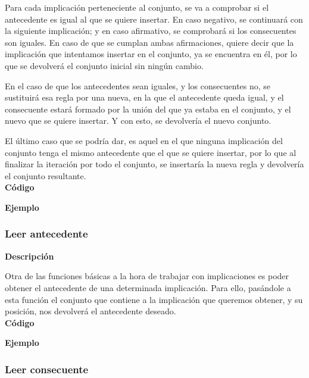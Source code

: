     Para cada implicaci\'on perteneciente al conjunto, se va a comprobar si el antecedente es igual al que se quiere insertar.
    En caso negativo, se continuar\'a con la siguiente implicaci\'on; y en caso afirmativo, se comprobar\'a si los consecuentes son 
    iguales. En caso de que se cumplan ambas afirmaciones, quiere decir que la implicaci\'on que intentamos insertar en el conjunto, 
    ya se encuentra en \'el, por lo que se devolver\'a el conjunto inicial sin ning\'un cambio.

    En el caso de que los antecedentes sean iguales, y los consecuentes no, se sustituir\'a esa regla por una nueva, en la que el antecedente 
    queda igual, y el consecuente estar\'a formado por la uni\'on del que ya estaba en el conjunto, y el nuevo que se quiere insertar. Y con 
    esto, se devolver\'ia el nuevo conjunto.

    El \'ultimo caso que se podr\'ia dar, es aquel en el que ninguna implicaci\'on del conjunto tenga el mismo antecedente que el que se 
    quiere insertar, por lo que al finalizar la iteraci\'on por todo el conjunto, se insertar\'ia la nueva regla y devolver\'ia el conjunto 
    resultante.
    \\


    \textbf{C\'odigo}

    


    \textbf{Ejemplo}


\subsubsection{Leer antecedente}

    \textbf{Descripci\'on}

    Otra de las funciones b\'asicas a la hora de trabajar con implicaciones es poder obtener el antecedente de una determinada 
    implicaci\'on. Para ello, pas\'andole a esta funci\'on el conjunto que contiene a la implicaci\'on que queremos obtener, y su 
    posici\'on, nos devolver\'a el antecedente deseado.
    \\


    \textbf{C\'odigo}

    


    \textbf{Ejemplo}


\subsubsection{Leer consecuente}

